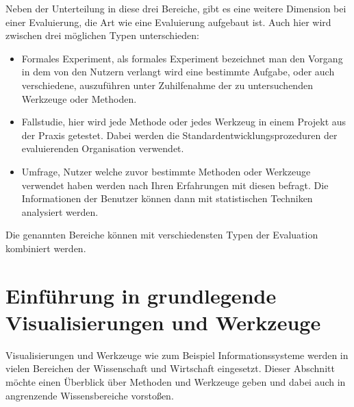 \documentclass[draft=false
              ,paper=a4
              ,twoside=false
              ,fontsize=11pt
              ,headsepline
              ,BCOR10mm
              ,DIV11
              ]{scrbook}
\newcommand{\TODO}[1]{\colorbox{yellow}{\textcolor{red}{[TODO: #1]}}}
\begin{document}
Neben der Unterteilung in diese drei Bereiche, gibt es eine weitere Dimension bei einer Evaluierung, die Art wie eine Evaluierung aufgebaut ist. Auch hier wird zwischen drei möglichen Typen unterschieden:

\begin{itemize}
  \item Formales Experiment, als formales Experiment bezeichnet man den Vorgang in dem von den Nutzern verlangt wird eine bestimmte Aufgabe, oder auch verschiedene, auszuführen unter Zuhilfenahme der zu untersuchenden Werkzeuge oder Methoden. 
  \item Fallstudie, hier wird jede Methode oder jedes Werkzeug in einem Projekt aus der Praxis getestet. Dabei werden die Standardentwicklungsprozeduren der evaluierenden Organisation verwendet.
  \item Umfrage, Nutzer welche zuvor bestimmte Methoden oder Werkzeuge verwendet haben werden nach Ihren Erfahrungen mit diesen befragt. Die Informationen der Benutzer können dann mit statistischen Techniken analysiert werden.
\end{itemize}

Die genannten Bereiche können mit verschiedensten Typen der Evaluation kombiniert werden.

\section{Einführung in grundlegende Visualisierungen und Werkzeuge} %
\label{sec:visualisierungen_und_werkzeuge}

Visualisierungen und Werkzeuge wie zum Beispiel Informationssysteme werden in vielen Bereichen der Wissenschaft und Wirtschaft eingesetzt. Dieser Abschnitt möchte einen Überblick über Methoden und Werkzeuge geben und dabei auch in angrenzende Wissensbereiche vorstoßen. 
\end{document}
